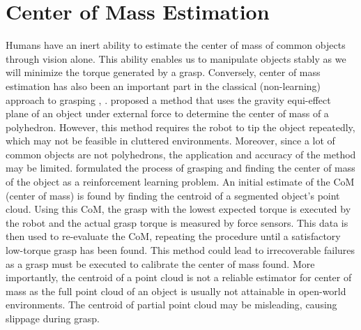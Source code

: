\documentclass[12pt]{ucsddissertation}
\begin{document}
\section{Center of Mass Estimation}
Humans have an inert ability to estimate the center of mass of common objects through vision alone. This ability enables us to manipulate objects stably as we will minimize the torque generated by a grasp. Conversely, center of mass estimation has also been an important part in the classical (non-learning) approach to grasping \cite{Kanoulas_Lee_Caldwell_Tsagarakis_2018}, \cite{Yong_Yu_Fukuda_Tsujio_1999}. \cite{Yong_Yu_Fukuda_Tsujio_1999} proposed a method that uses the gravity equi-effect plane of an object under external force to determine the center of mass of a polyhedron. However, this method requires the robot to tip the object repeatedly, which may not be feasible in cluttered environments. Moreover, since a lot of common objects are not polyhedrons, the application and accuracy of the method may be limited. \cite{Kanoulas_Lee_Caldwell_Tsagarakis_2018} formulated the process of grasping and finding the center of mass of the object as a reinforcement learning problem. An initial estimate of the CoM (center of mass) is found by finding the centroid of a segmented object's point cloud. Using this CoM, the grasp with the lowest expected torque is executed by the robot and the actual grasp torque is measured by force sensors. This data is then used to re-evaluate the CoM, repeating the procedure until a satisfactory low-torque grasp has been found. This method could lead to irrecoverable failures as a grasp must be executed to calibrate the center of mass found. More importantly, the centroid of a point cloud is not a reliable estimator for center of mass as the full point cloud of an object is usually not attainable in open-world environments. The centroid of partial point cloud may be misleading, causing slippage during grasp.
\end{document}
